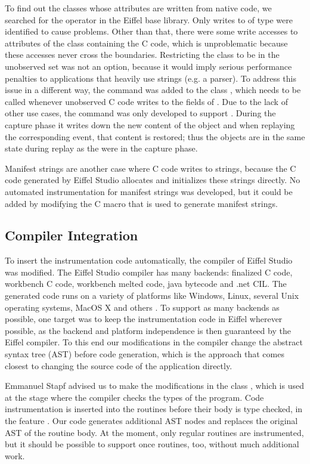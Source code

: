To find out the classes whose attributes are written from native code, we searched for the \identifier{\$} operator in the Eiffel base library. Only writes to  of type  were identified to cause problems. Other than that, there were some write accesses to attributes of the class containing the C code, which is unproblematic because these accesses never cross the boundaries.
Restricting the class  to be in the unobserved set was not an option, because it would imply serious performance penalties to applications that heavily use strings (e.g. a parser). To address this issue in a different way, the command  was added to the class , which needs to be called whenever unobserved C code writes to the fields of . Due to the lack of other use cases, the command was only developed to support . During the capture phase it writes down the new content of the object and when replaying the corresponding event, that content is restored; thus the objects are in the same state during replay as the were in the capture phase.

Manifest strings are another case where C code writes to strings, because the C code generated by Eiffel Studio allocates and initializes these strings directly. No automated instrumentation for manifest strings was developed, but it could be added by modifying the C macro that is used to generate manifest strings.


\subsection{Compiler Integration}
To insert the instrumentation code automatically, the compiler of Eiffel Studio was modified. The Eiffel Studio compiler has many backends: finalized C code, workbench C code, workbench melted code, java bytecode and .net CIL. The generated code runs on a variety of platforms like Windows, Linux, several Unix operating systems, MacOS X and others \cite{eiffelsoftware}. To support as many backends as possible, one target was to keep the instrumentation code in Eiffel wherever possible, as the backend and platform independence is then guaranteed by the Eiffel compiler. To this end our modifications in the compiler change the abstract syntax tree (AST) before code generation, which is the approach that comes closest to changing the source code of the application directly.

Emmanuel Stapf advised us to make the modifications in the class , which is used at the stage where the compiler checks the types of the program. Code instrumentation is inserted into the routines before their body is type checked, in the feature . Our code generates additional AST nodes and replaces the original AST of the routine body. At the moment, only regular routines are instrumented, but it should be possible to support once routines, too, without much additional work. 

